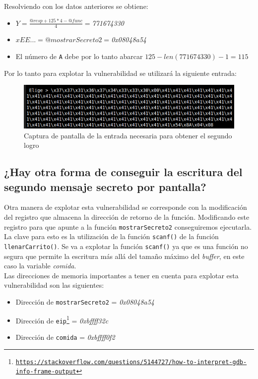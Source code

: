 \documentclass[10pt,a4paper]{article}
\begin{document}
Resolviendo con los datos anteriores se obtiene:
\begin{itemize}
\item $Y=\frac{@resp + 125*4 - @func}{4}=$\emph{771674330}
\item $xEE...=@mostrarSecreto2=$\emph{0x08048a54}
\item El número de \texttt{A} debe por lo tanto abarcar $125-len(771674330)-1=115$
\end{itemize}

Por lo tanto para explotar la vulnerabilidad se utilizará la siguiente entrada:

\begin{figure}[h!]
\centering
\includegraphics[scale=0.9]{images/input_segundo_logro.png}
\caption{Captura de pantalla de la entrada necesaria para obtener el segundo logro}
\label{fig:inputSegundoLogro}
\end{figure}


\subsection{¿Hay otra forma de conseguir la escritura del segundo mensaje secreto por pantalla?}

Otra manera de explotar esta vulnerabilidad se corresponde con la modificación del registro que almacena la dirección de retorno de la función. Modificando este registro para que apunte a la función \texttt{mostrarSecreto2} conseguiremos ejecutarla.\\
La clave para esto es la utilización de la función \texttt{scanf()} de la función \texttt{llenarCarrito()}. Se va a explotar la función \texttt{scanf()} ya que es una función no segura que permite la escritura más allá del tamaño máximo del \emph{buffer}, en este caso la variable \emph{comida}.\\
Las direcciones de memoria importantes a tener en cuenta para explotar esta vulnerabilidad son las siguientes:
\begin{itemize}
\item Dirección de \texttt{mostrarSecreto2} = \emph{0x08048a54}
\item Dirección de \texttt{eip\footnote{\url{https://stackoverflow.com/questions/5144727/how-to-interpret-gdb-info-frame-output}}} = \emph{0xbffff32c}
\item Dirección de \texttt{comida} = \emph{0xbffff0f2}
\end{itemize}
\end{document}
